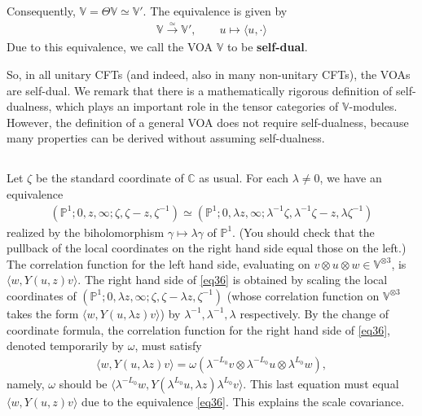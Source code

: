 \documentclass[12pt,a4paper,notitlepage]{article}
\theoremstyle{definition}
\theoremstyle{plain}
\newcommand{\bk}[1]{\langle {#1}\rangle}
\newcommand{\Vbb}{\mathbb V}
\newcommand{\Cbb}{\mathbb C}
\newcommand{\Pbb}{\mathbb P}
\numberwithin{equation}{section}
\begin{document}
Consequently, $\Vbb=\Theta\Vbb\simeq\Vbb'$. The equivalence is given by
\begin{align}
	\Vbb\xrightarrow{\simeq}\Vbb',\qquad u\mapsto \bk{u,\cdot}	
\end{align}
Due to this equivalence, we call the VOA $\Vbb$ to be \textbf{self-dual}.	


So, in all unitary CFTs (and indeed, also in many non-unitary CFTs), the VOAs are self-dual. We remark that there is a mathematically rigorous definition of self-dualness, which plays an important role in the tensor categories of $\Vbb$-modules. However, the definition of a general VOA does not require self-dualness, because many properties can be derived without assuming self-dualness.



\subsection{}\label{lb31}


Let $\zeta$ be the standard coordinate of $\Cbb$ as usual. For each $\lambda\neq0$, we have an equivalence
\begin{align}
(\Pbb^1;0,z,\infty;\zeta,\zeta-z,\zeta^{-1})\simeq (\Pbb^1;0,\lambda z,\infty;\lambda^{-1}\zeta,\lambda^{-1}\zeta-z,\lambda\zeta^{-1})\label{eq36}
\end{align}
realized by the biholomorphism $\gamma\mapsto \lambda\gamma$ of $\Pbb^1$. (You should check that the pullback of the local coordinates on the right hand side equal those on the left.) The correlation function for the left hand side, evaluating on $v\otimes u\otimes w\in\Vbb^{\otimes 3}$, is $\bk{w,Y(u,z)v}$. The right hand side of \eqref{eq36} is obtained by scaling the local coordinates of $(\Pbb^1;0,\lambda z,\infty;\zeta,\zeta-\lambda z,\zeta^{-1})$ (whose correlation function on $\Vbb^{\otimes 3}$ takes the form $\bk{w,Y(u,\lambda z)v}$) by $\lambda^{-1},\lambda^{-1},\lambda$ respectively. By the change of coordinate formula, the correlation function for the right hand side of \eqref{eq36}, denoted temporarily by $\omega$, must satisfy
\begin{align*}
\bk{w,Y(u,\lambda z)v}=\omega(\lambda^{-L_0}v\otimes \lambda^{-L_0}u\otimes\lambda^{L_0}w),	
\end{align*}
namely, $\omega$ should be $\bk{\lambda^{-L_0}w,Y(\lambda^{L_0}u,\lambda z)\lambda^{L_0}v}$. This last equation must equal  $\bk{w,Y(u,z)v}$ due to the equivalence \eqref{eq36}. This explains the scale covariance.
\end{document}
